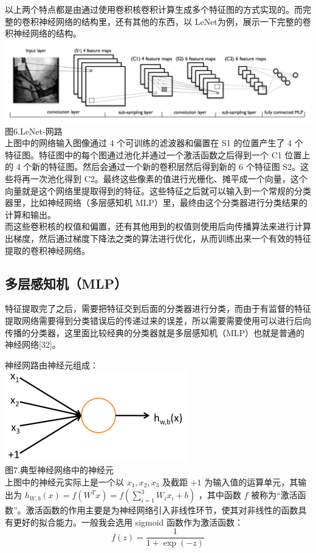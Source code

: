 以上两个特点都是由通过使用卷积核卷积计算生成多个特征图的方式实现的。而完整的卷积神经网络的结构里，还有其他的东西，以
LeNet为例，展示一下完整的卷积神经网络的结构。\\\includegraphics{picture/lenet.png}\\图6.LeNet-网路\\上图中的网络输入图像通过
4 个可训练的滤波器和偏置在 S1 的位置产生了 4
个特征图。特征图中的每个图通过池化并通过一个激活函数之后得到一个 C1
位置上的 4 个新的特征图。然后会通过一个新的卷积层然后得到新的 6 个特征图
S2。这些将再一次池化得到
C2。最终这些像素的值进行光栅化、摊平成一个向量，这个向量就是这个网络里提取得到的特征。这些特征之后就可以输入到一个常规的分类器里，比如神经网络（多层感知机
MLP）里，最终由这个分类器进行分类结果的计算和输出。\\而这些卷积核的权值和偏置，还有其他用到的权值则使用后向传播算法来进行计算出梯度，然后通过梯度下降法之类的算法进行优化，从而训练出来一个有效的特征提取的卷积神经网络。

\subsection{多层感知机（MLP）}\label{ux591aux5c42ux611fux77e5ux673amlp}

特征提取完了之后，需要把特征交到后面的分类器进行分类，而由于有监督的特征提取网络需要得到分类错误后的传递过来的误差，所以需要需要使用可以进行后向传播的分类器，这里面比较经典的分类器就是多层感知机（MLP）也就是普通的神经网络{[}32{]}。

神经网路由神经元组成：\\\includegraphics{picture/single-neuron.png}\\图7.典型神经网络中的神经元\\上图中的神经元实际上是一个以
\(x_1, x_2, x_3\) 及截距 \(+1\) 为输入值的运算单元，其输出为
\(h_{W,b}(x) = f(W^Tx) = f(\sum_{i=1}^3 W_{i}x_i +b)\) ，其中函数 \(f\)
被称为``激活函数''。激活函数的作用主要是为神经网络引入非线性环节，使其对非线性的函数具有更好的拟合能力。一般我会选用
sigmoid 函数作为激活函数：\\\[f(z) = \frac{1}{1+\exp(-z)}\]

